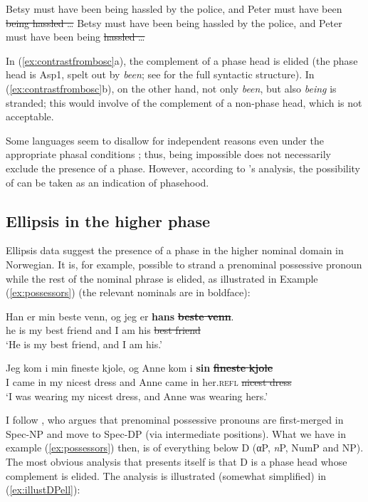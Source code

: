 \documentclass[output=paper]{langsci/langscibook}
\begin{document}
\ea\label{ex:contrastfrombosc}
	\ea Betsy must have been being hassled by the police, and Peter must have been \sout{being hassled \dots}
    \ex *Betsy must have been being hassled by the police, and Peter must have been being \sout{hassled \dots}
	\z
\z

\noindent In (\ref{ex:contrastfrombosc}a), the complement of a phase head is
elided (the phase head is Asp1, spelt out by \emph{been}; see
\citealt[62]{Boskovic2014} for the full syntactic structure).  In
(\ref{ex:contrastfrombosc}b), on the other hand, not only \emph{been}, but also
\emph{being} is stranded; this would involve  of the complement of a
non-phase head, which is not acceptable.

Some languages seem to disallow  for independent reasons even
under the appropriate phasal conditions \citep[48]{Boskovic2014}; thus,
 being impossible does not necessarily exclude the presence of a
phase.  However, according to \citeauthor{Boskovic2014}'s analysis,
the possibility of  can be taken as an indication of phasehood.

\subsection{Ellipsis in the higher phase}

Ellipsis data suggest the presence of a phase in the higher nominal domain in
Norwegian. It is, for example, possible to strand a prenominal possessive
pronoun while the rest of the nominal phrase is elided, as illustrated in
Example (\ref{ex:possessors}) (the relevant nominals are in boldface):\newpage

\ea\label{ex:possessors} 
		\ea
		 \gll Han er min beste venn, og jeg er \textbf{hans} \sout{\textbf{beste} \textbf{venn}}.\\
		 he is my best friend and I am his \sout{best friend}\\
		 \glt `He is my best friend, and I am his.'

		\ex
		\gll Jeg kom i min fineste kjole, og Anne kom i \textbf{sin} \sout{\textbf{fineste} \textbf{kjole}}\\
		I came in my nicest dress and Anne came in her.\textsc{refl} \sout{nicest dress}\\
		\glt `I was wearing my nicest dress, and Anne was wearing hers.'

		\z
\z

\noindent I follow \citet[207, 210]{julien2005nominal}, who argues that
prenominal possessive pronouns are first-merged in Spec-NP and move to Spec-DP
(via intermediate positions). What we have in example (\ref{ex:possessors})
then, is  of everything below D (α{}P, \emph{n}P, NumP and NP).
The most obvious analysis that presents itself is that D is a phase
head whose complement is elided. The analysis is illustrated (somewhat
simplified) in (\ref{ex:illustDPell}):
\end{document}
